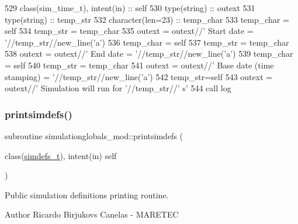 \begin{DoxyCode}
529     \textcolor{keywordtype}{class}(sim\_time\_t), \textcolor{keywordtype}{intent(in)} :: self
530     \textcolor{keywordtype}{type}(string) :: outext
531     \textcolor{keywordtype}{type}(string) :: temp\_str
532     \textcolor{keywordtype}{character(len=23)} :: temp\_char
533     temp\_char = self%
534     temp\_str = temp\_char
535     outext = outext//\textcolor{stringliteral}{'      Start date                = '}//temp\_str//new\_line(\textcolor{stringliteral}{'a'})
536     temp\_char = self%
537     temp\_str = temp\_char
538     outext = outext//\textcolor{stringliteral}{'       End date                  = '}//temp\_str//new\_line(\textcolor{stringliteral}{'a'})
539     temp\_char = self%
540     temp\_str = temp\_char
541     outext = outext//\textcolor{stringliteral}{'       Base date (time stamping) = '}//temp\_str//new\_line(\textcolor{stringliteral}{'a'})
542     temp\_str=self%
543     outext = outext//\textcolor{stringliteral}{'       Simulation will run for '}//temp\_str//\textcolor{stringliteral}{' s'}
544     \textcolor{keyword}{call }log%
\end{DoxyCode}
\mbox{\label{namespacesimulationglobals__mod_a54196bff569fc838730ba39a722319ff}} 
\subsubsection{\texorpdfstring{printsimdefs()}{printsimdefs()}}
{\footnotesize\ttfamily subroutine simulationglobals\+\_\+mod\+::printsimdefs (\begin{DoxyParamCaption}\item[{class(\mbox{\hyperlink{structsimulationglobals__mod_1_1simdefs__t}{simdefs\+\_\+t}}), intent(in)}]{self }\end{DoxyParamCaption})\hspace{0.3cm}{\ttfamily [private]}}



Public simulation definitions printing routine. 

\begin{DoxyAuthor}{Author}
Ricardo Birjukovs Canelas -\/ M\+A\+R\+E\+T\+EC 
\end{DoxyAuthor}


